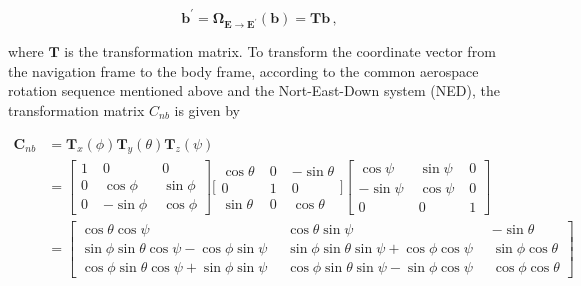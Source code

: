 \begin{equation}\label{eq:transformation}
  \mathbf{b^{'}} = \mathbf{\Omega}_{\mathbf{E} \rightarrow \mathbf{E}^{'}}(\mathbf{b}) = \mathbf{T} \mathbf{b}\,,
\end{equation}

\noindent
where $\mathbf{T}$ is the transformation matrix. To transform the coordinate vector from the navigation frame to the body frame, according to the common aerospace rotation sequence mentioned above and the Nort-East-Down system (NED), the transformation matrix $C_{nb}$ is given by

\begin{equation}
\begin{split}
\mathbf{C}_{nb} & = \mathbf{T}_x(\phi) \mathbf{T}_y(\theta) \mathbf{T}_z(\psi) \\
 & = {\left[ \begin{smallmatrix}
    1 \; & 0 \; & 0 \\
    0 \; & \cos \phi \; & \sin \phi \\
    0 \; & -\sin \phi \; & \cos \phi
    \end{smallmatrix}\right]}
    {\bigg[ \begin{smallmatrix}
    \cos \theta \; & 0 \; & -\sin \theta \\
    0 \; & 1 \; & 0 \\
    \sin \theta \; & 0 \; & \cos \theta
    \end{smallmatrix} \bigg]}
    {\left[\begin{smallmatrix}
    \cos \psi \; & \sin \psi \; & 0 \\
    -\sin \psi \; & \cos \psi \; & 0 \\
    0 \; & 0 \; & 1
    \end{smallmatrix}\right]}\\
 & = {\left[\begin{smallmatrix}
   \cos \theta \cos \psi \; &
    \cos \theta \sin \psi \; &
   -\sin \theta \\
    \sin \phi \sin \theta \cos \psi - \cos \phi \sin \psi \;\; &
    \sin \phi \sin \theta \sin \psi + \cos \phi \cos \psi \;\; &
    \sin \phi \cos \theta \\
    \cos \phi \sin \theta \cos \psi + \sin \phi \sin \psi \;\; &
    \cos \phi \sin \theta \sin \psi - \sin \phi \cos \psi \;\; &
    \cos \phi \cos \theta
  \end{smallmatrix}\right]}
\end{split}
\end{equation}

